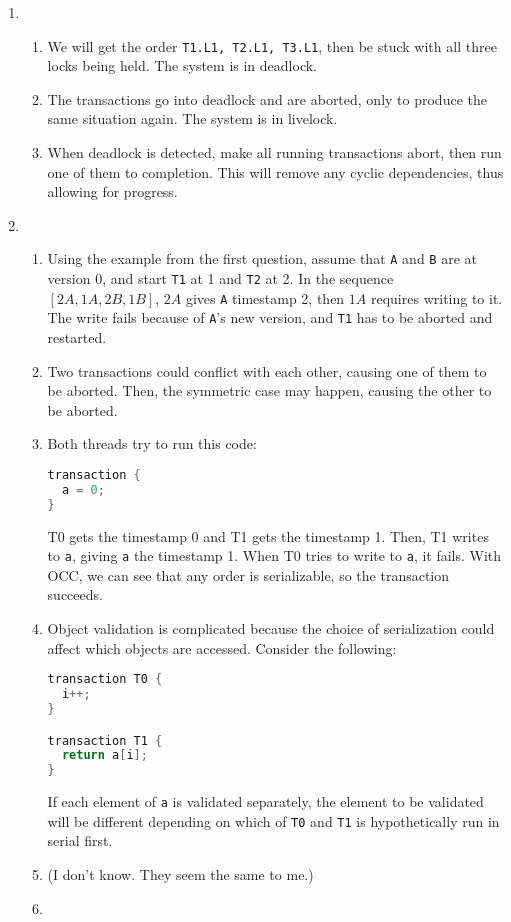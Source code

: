 \documentclass{article}
\begin{document}
\begin{enumerate}
\item
  \begin{enumerate}
  \item We will get the order \texttt{T1.L1, T2.L1, T3.L1}, then be stuck with all three locks being held. The system is in deadlock.
  \item The transactions go into deadlock and are aborted, only to produce the same situation again. The system is in livelock.
  \item When deadlock is detected, make all running transactions abort, then run one of them to completion. This will remove any cyclic dependencies, thus allowing for progress.
  \end{enumerate}

\item
  \begin{enumerate}
  \item Using the example from the first question, assume that \texttt{A} and \texttt{B} are at version 0, and start \texttt{T1} at 1 and \texttt{T2} at 2. In the sequence $[2A,1A,2B,1B]$, $2A$ gives \texttt{A} timestamp 2, then $1A$ requires writing to it. The write fails because of \texttt{A}'s new version, and \texttt{T1} has to be aborted and restarted.
  \item Two transactions could conflict with each other, causing one of them to be aborted. Then, the symmetric case may happen, causing the other to be aborted.
  \item Both threads try to run this code:
    \begin{lstlisting}[language=C]
transaction {
  a = 0;
}
    \end{lstlisting}
    T0 gets the timestamp 0 and T1 gets the timestamp 1. Then, T1 writes to \texttt{a}, giving \texttt{a} the timestamp 1. When T0 tries to write to \texttt{a}, it fails. With OCC, we can see that any order is serializable, so the transaction succeeds.
  \item Object validation is complicated because the choice of serialization could affect which objects are accessed. Consider the following:
    \begin{lstlisting}[language=C]
transaction T0 {
  i++;
}

transaction T1 {
  return a[i];
}
    \end{lstlisting}
    If each element of \texttt{a} is validated separately, the element to be validated will be different depending on which of \texttt{T0} and \texttt{T1} is hypothetically run in serial first.
  \item (I don't know. They seem the same to me.)
  \item
  \end{enumerate}
\end{enumerate}
\end{document}
